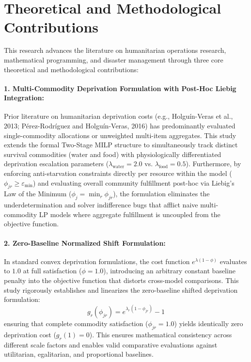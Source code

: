 \section{Theoretical and Methodological Contributions}
\label{sec:contributions}

This research advances the literature on humanitarian operations research, mathematical programming, and disaster management through three core theoretical and methodological contributions:

\paragraph{1. Multi-Commodity Deprivation Formulation with Post-Hoc Liebig Integration:}
Prior literature on humanitarian deprivation costs (e.g., Holgu{\'i}n-Veras et al., 2013; P{\'e}rez-Rodr{\'i}guez and Holgu{\'i}n-Veras, 2016) has predominantly evaluated single-commodity allocations or unweighted multi-item aggregates. This study extends the formal Two-Stage MILP structure to simultaneously track distinct survival commodities (water and food) with physiologically differentiated deprivation escalation parameters ($\lambda_{\text{water}} = 2.0$ vs. $\lambda_{\text{food}} = 0.5$). Furthermore, by enforcing anti-starvation constraints directly per resource within the model ($\phi_{jr} \ge \varepsilon_{\min}$) and evaluating overall community fulfillment post-hoc via Liebig's Law of the Minimum ($\phi_j = \min_r \phi_{jr}$), the formulation eliminates the underdetermination and solver indifference bugs that afflict naive multi-commodity LP models where aggregate fulfillment is uncoupled from the objective function.

\paragraph{2. Zero-Baseline Normalized Shift Formulation:}
In standard convex deprivation formulations, the cost function $e^{\lambda(1-\phi)}$ evaluates to $1.0$ at full satisfaction ($\phi = 1.0$), introducing an arbitrary constant baseline penalty into the objective function that distorts cross-model comparisons. This study rigorously establishes and linearizes the zero-baseline shifted deprivation formulation:
\begin{equation}
    g_r(\phi_{jr}) = e^{\lambda_r(1-\phi_{jr})} - 1
\end{equation}
ensuring that complete commodity satisfaction ($\phi_{jr} = 1.0$) yields identically zero deprivation cost ($g_r(1) = 0$). This ensures mathematical consistency across different scale factors and enables valid comparative evaluations against utilitarian, egalitarian, and proportional baselines.


